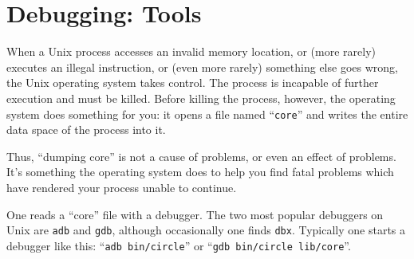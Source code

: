 \documentclass{article}
\begin{document}
\section{Debugging: Tools}
When a Unix process accesses an invalid memory location, or (more rarely) executes an illegal instruction, or (even more rarely) something else goes wrong, the Unix operating system takes control. The process is incapable of further execution and must be killed. Before killing the process, however, the operating system does something for you: it opens a file named ``\texttt{core}'' and writes the entire data space of the process into it.
\par
Thus, ``dumping core'' is not a cause of problems, or even an effect of problems.  It's something the operating system does to help you find fatal problems which have rendered your process unable to continue.
\par
One reads a ``core'' file with a debugger.  The two most popular debuggers on Unix are \texttt{adb} and \texttt{gdb}, although occasionally one finds \texttt{dbx}.  Typically one starts a debugger like this: ``\texttt{adb bin/circle}'' or ``\texttt{gdb bin/circle lib/core}''.
\par
\end{document}
